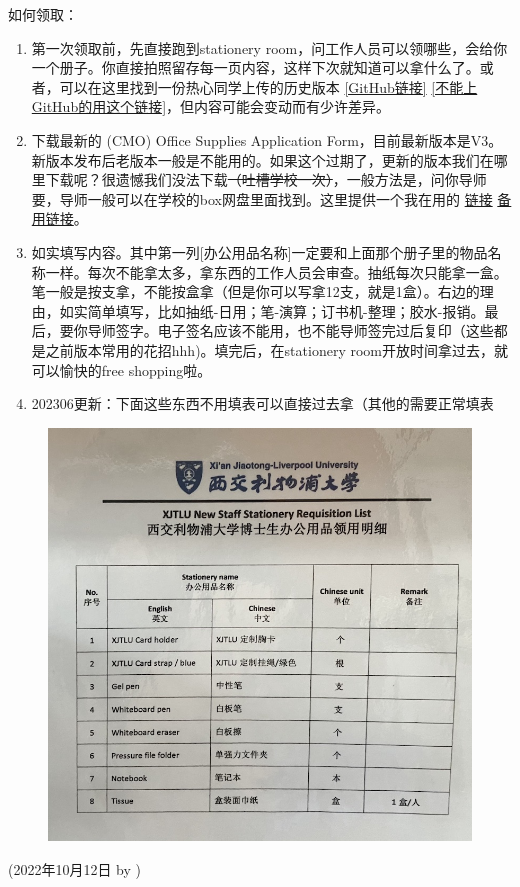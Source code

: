 \hfill\break
如何领取：
\begin{enumerate}
    \item 第一次领取前，先直接跑到stationery room，问工作人员可以领哪些，会给你一个册子。你直接拍照留存每一页内容，这样下次就知道可以拿什么了。或者，可以在这里找到一份热心同学上传的历史版本 \href{https://github.com/kaiwu-astro/xp_pgrs_unofficial_guide/tree/main/fileshare}{[GitHub链接]} \href{https://gitee.com/kaiwu-astro/xp_pgrs_unofficial_guide/tree/main/fileshare}{[不能上GitHub的用这个链接]}，但内容可能会变动而有少许差异。
    \item 下载最新的 (CMO) Office Supplies Application Form，目前最新版本是V3。新版本发布后老版本一般是不能用的。如果这个过期了，更新的版本我们在哪里下载呢？很遗憾我们没法下载\sout{（吐槽学校一次）}，一般方法是，问你导师要，导师一般可以在学校的box网盘里面找到。这里提供一个我在用的 \href{https://github.com/kaiwu-astro/xp_pgrs_unofficial_guide/tree/main/fileshare}{链接} \href{https://gitee.com/kaiwu-astro/xp_pgrs_unofficial_guide/tree/main/fileshare}{备用链接}。
    \item 如实填写内容。其中第一列[办公用品名称]一定要和上面那个册子里的物品名称一样。每次不能拿太多，拿东西的工作人员会审查。抽纸每次只能拿一盒。笔一般是按支拿，不能按盒拿（但是你可以写拿12支，就是1盒）。右边的理由，如实简单填写，比如抽纸-日用；笔-演算；订书机-整理；胶水-报销。最后，要你导师签字。电子签名应该不能用，也不能导师签完过后复印（这些都是之前版本常用的花招hhh)。填完后，在stationery room开放时间拿过去，就可以愉快的free shopping啦。
    \item 202306更新：下面这些东西不用填表可以直接过去拿（其他的需要正常填表
\end{enumerate}

\begin{figure}[H]
    \centering
    \includegraphics[width=0.6\columnwidth]{author-folder/Kai.Wu/stationery_no_sign.jpg}
\end{figure}


\begin{flushright}
(2022年10月12日 by \Wu)
\end{flushright}
